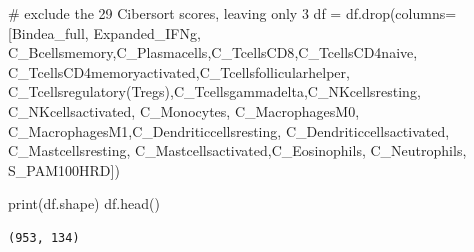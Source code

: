 \documentclass[
  letterpaper,
  DIV=11,
  numbers=noendperiod]{scrartcl}
\newenvironment{Shaded}{\begin{snugshade}}{\end{snugshade}}
\newcommand{\BuiltInTok}[1]{\textcolor[rgb]{0.00,0.23,0.31}{#1}}
\newcommand{\CommentTok}[1]{\textcolor[rgb]{0.37,0.37,0.37}{#1}}
\newcommand{\NormalTok}[1]{\textcolor[rgb]{0.00,0.23,0.31}{#1}}
\newcommand{\OperatorTok}[1]{\textcolor[rgb]{0.37,0.37,0.37}{#1}}
\newcommand{\StringTok}[1]{\textcolor[rgb]{0.13,0.47,0.30}{#1}}
\begin{document}
\begin{Shaded}
\begin{Highlighting}[]
\CommentTok{\# exclude the 29 Cibersort scores, leaving only 3}
\NormalTok{df }\OperatorTok{=}\NormalTok{ df.drop(columns}\OperatorTok{=}\NormalTok{[}\StringTok{\textquotesingle{}Bindea\_full\textquotesingle{}}\NormalTok{, }\StringTok{\textquotesingle{}Expanded\_IFNg\textquotesingle{}}\NormalTok{, }
        \StringTok{\textquotesingle{}C\_Bcellsmemory\textquotesingle{}}\NormalTok{,}\StringTok{\textquotesingle{}C\_Plasmacells\textquotesingle{}}\NormalTok{,}\StringTok{\textquotesingle{}C\_TcellsCD8\textquotesingle{}}\NormalTok{,}\StringTok{\textquotesingle{}C\_TcellsCD4naive\textquotesingle{}}\NormalTok{,}
         \StringTok{\textquotesingle{}C\_TcellsCD4memoryactivated\textquotesingle{}}\NormalTok{,}\StringTok{\textquotesingle{}C\_Tcellsfollicularhelper\textquotesingle{}}\NormalTok{,}
         \StringTok{\textquotesingle{}C\_Tcellsregulatory(Tregs)\textquotesingle{}}\NormalTok{,}\StringTok{\textquotesingle{}C\_Tcellsgammadelta\textquotesingle{}}\NormalTok{,}\StringTok{\textquotesingle{}C\_NKcellsresting\textquotesingle{}}\NormalTok{,}
         \StringTok{\textquotesingle{}C\_NKcellsactivated\textquotesingle{}}\NormalTok{, }\StringTok{\textquotesingle{}C\_Monocytes\textquotesingle{}}\NormalTok{, }\StringTok{\textquotesingle{}C\_MacrophagesM0\textquotesingle{}}\NormalTok{,}
         \StringTok{\textquotesingle{}C\_MacrophagesM1\textquotesingle{}}\NormalTok{,}\StringTok{\textquotesingle{}C\_Dendriticcellsresting\textquotesingle{}}\NormalTok{,}
         \StringTok{\textquotesingle{}C\_Dendriticcellsactivated\textquotesingle{}}\NormalTok{, }\StringTok{\textquotesingle{}C\_Mastcellsresting\textquotesingle{}}\NormalTok{,}
         \StringTok{\textquotesingle{}C\_Mastcellsactivated\textquotesingle{}}\NormalTok{,}\StringTok{\textquotesingle{}C\_Eosinophils\textquotesingle{}}\NormalTok{, }\StringTok{\textquotesingle{}C\_Neutrophils\textquotesingle{}}\NormalTok{, }\StringTok{\textquotesingle{}S\_PAM100HRD\textquotesingle{}}\NormalTok{])}

\BuiltInTok{print}\NormalTok{(df.shape)}
\NormalTok{df.head()}
\end{Highlighting}
\end{Shaded}

\begin{verbatim}
(953, 134)
\end{verbatim}
\end{document}
